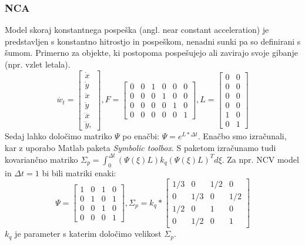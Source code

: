 \documentclass[a4paper]{article}
\begin{document}
\subsubsection{NCA}
Model skoraj konstantnega pospeška (angl. near constant acceleration) je predstavljen s konstantno hitrostjo in pospeškom, nenadni sunki pa so definirani s šumom. Primerno za objekte, ki postopoma pospešujejo ali zavirajo svoje gibanje (npr. vzlet letala). 
$$
\dot{w_t}=
\begin{bmatrix}
\dot{x}\\\dot{y}\\\ddot{x}\\\ddot{y}\\\dddot{x}\\\dddot{y},
\end{bmatrix}
,F = \begin{bmatrix}
0&0&1&0&0&0\\0&0&0&1&0&0\\0&0&0&0&1&0\\0&0&0&0&0&1
\end{bmatrix}
,L = \begin{bmatrix}
0&0\\0&0\\0&0\\0&0\\1&0\\0&1
\end{bmatrix}
$$
Sedaj lahko določimo matriko $\Psi$ po enačbi: $\Psi = e^{L*\Delta t}$. Enačbo smo izračunali, kar z uporabo Matlab paketa \textit{Symbolic toolbox}. S paketom izračunamo tudi kovariančno matriko $\Sigma_p = \int_0^{\Delta t} (\Psi(\xi)L)k_q(\Psi(\xi)L)^{T}d\xi$. Za npr. NCV model in $\Delta t=1$ bi bili matriki enaki:
$$
\Psi=
\begin{bmatrix}
	1&0&1&0\\0&1&0&1\\0&0&1&0\\0&0&0&1
\end{bmatrix}
,\Sigma_p = k_q*\begin{bmatrix}
	1/3&0&1/2&0\\0&1/3&0&1/2\\1/2&0&1&0\\0&1/2&0&1
\end{bmatrix}
$$ 
$k_q$ je parameter s katerim določimo velikost $\Sigma_p$.
 
\end{document}
